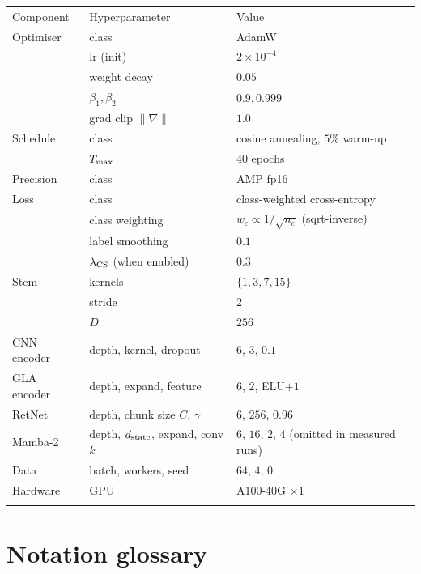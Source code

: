 \documentclass[final]{ws-ijwmip}
\begin{document}
\begin{table}[!htbp]
{\begin{tabular}{lll}
\toprule
Component & Hyperparameter & Value \\
\colrule
Optimiser & class & AdamW \\
          & lr (init) & $2\times 10^{-4}$ \\
          & weight decay & $0.05$ \\
          & $\beta_1, \beta_2$ & $0.9, 0.999$ \\
          & grad clip $\|\nabla\|$ & $1.0$ \\
Schedule  & class & cosine annealing, $5\%$ warm-up \\
          & $T_{\rm max}$ & $40$ epochs \\
Precision & class & AMP fp16 \\
Loss      & class & class-weighted cross-entropy \\
          & class weighting & $w_c \propto 1/\sqrt{n_c}$ (sqrt-inverse) \\
          & label smoothing & $0.1$ \\
          & $\lambda_{\rm CS}$ (when enabled) & $0.3$ \\
Stem      & kernels & $\{1,3,7,15\}$ \\
          & stride & $2$ \\
          & $D$ & $256$ \\
CNN encoder  & depth, kernel, dropout & $6$, $3$, $0.1$ \\
GLA encoder  & depth, expand, feature & $6$, $2$, ELU$+1$ \\
RetNet       & depth, chunk size $C$, $\gamma$ & $6$, $256$, $0.96$ \\
Mamba-2      & depth, $d_{\rm state}$, expand, conv $k$ & $6$, $16$, $2$, $4$ (omitted in measured runs) \\
Data         & batch, workers, seed & $64$, $4$, $0$ \\
Hardware     & GPU & A100-40G $\times 1$ \\
\botrule
\end{tabular}}
\end{table}

\section{Notation glossary}
\label{app:b}
\end{document}
